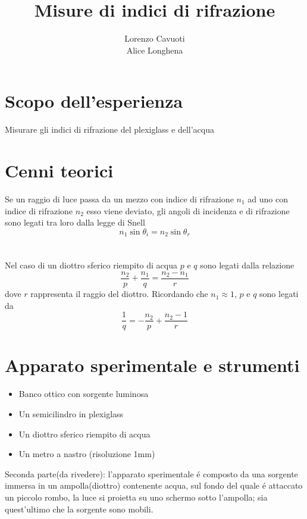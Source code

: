 \documentclass{article}
\title{Misure di indici di rifrazione}
\author{Lorenzo Cavuoti \\ Alice Longhena}
\begin{document}
	\maketitle
	
	\section{Scopo dell'esperienza}
		Misurare gli indici di rifrazione del plexiglass e dell'acqua
	
	\section{Cenni teorici}
		Se un raggio di luce passa da un mezzo con indice di rifrazione $n_1$ ad uno con indice di rifrazione $n_2$ esso viene deviato, gli angoli di incidenza e di rifrazione sono legati tra loro dalla legge di Snell
		\begin{equation}
		n_1 \sin\theta_i = n_2\sin\theta_r
		\label{Snell}
		\end{equation}\\\\
		
		Nel caso di un diottro sferico riempito di acqua $p$ e $q$ sono legati dalla relazione
		\begin{equation}
			\frac{n_2}{p} + \frac{n_1}{q} = \frac{n_2 - n_1}{r}
			\label{acqua}
		\end{equation}
		dove $r$ rappresenta il raggio del diottro. Ricordando che $n_1 \approx 1$, $p$ e $q$ sono legati da
		\begin{equation}
			\frac{1}{q} = -\frac{n_2}{p} + \frac{n_2-1}{r}
			\label{relazione p e q}
		\end{equation}
	
	\section{Apparato sperimentale e strumenti}
		\begin{itemize}
			\item Banco ottico con sorgente luminosa
			\item Un semicilindro in plexiglass
			\item Un diottro sferico riempito di acqua
			\item Un metro a nastro (risoluzione 1mm)
		\end{itemize}
	
	 Seconda parte(da rivedere): l'apparato sperimentale \'{e} composto da una sorgente immersa in un ampolla(diottro) contenente acqua, sul fondo del quale \'{e} attaccato un piccolo rombo, la luce si proietta su uno schermo sotto l'ampolla; sia quest'ultimo che la sorgente sono mobili.
	
\end{document}
